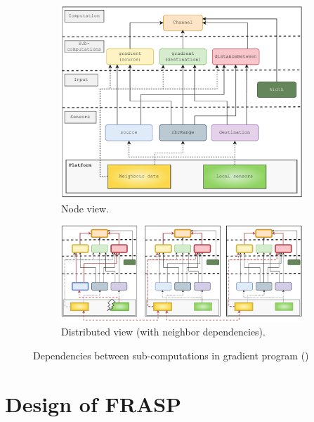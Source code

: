 \begin{figure}
    \centering
    \begin{subfigure}[b]{\textwidth}
        \centering
        \includegraphics[width=\textwidth]{figures/gradient-dependencies.png}
        \caption{Node view.}
        \label{fig:gradient-dependencies}
    \end{subfigure}
    \hfill
    \begin{subfigure}[b]{\textwidth}
        \centering
        \includegraphics[width=\textwidth]{figures/gradient-dependencies-distributed.png}
        \caption{Distributed view (with neighbor dependencies).}
        \label{fig:gradient-dependencies-distributed}
    \end{subfigure}
    \caption{Dependencies between sub-computations in gradient program ()}
\end{figure}

\section{Design of FRASP}
\label{section:design-of-frasp}

